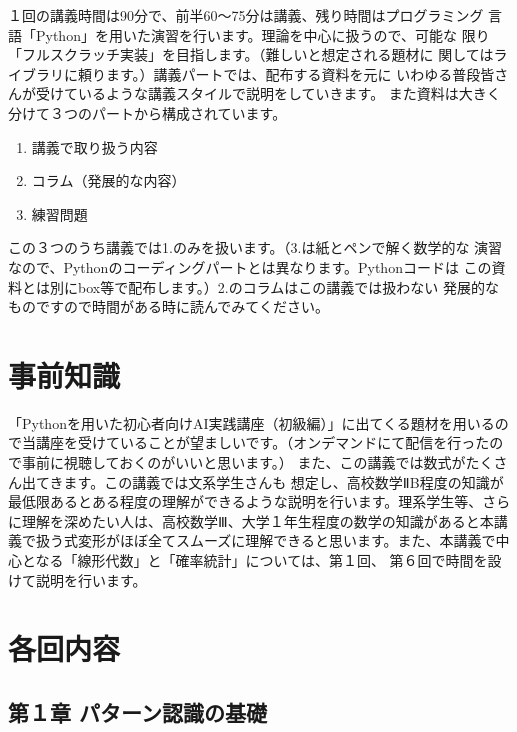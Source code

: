 \documentclass[
]{ltjarticle}
\begin{document}
１回の講義時間は90分で、前半60〜75分は講義、残り時間はプログラミング
言語「Python」を用いた演習を行います。理論を中心に扱うので、可能な
限り「フルスクラッチ実装」を目指します。（難しいと想定される題材に
関してはライブラリに頼ります。）講義パートでは、配布する資料を元に
いわゆる普段皆さんが受けているような講義スタイルで説明をしていきます。
また資料は大きく分けて３つのパートから構成されています。

\begin{enumerate}
\def\labelenumi{\arabic{enumi}.}
\item
  講義で取り扱う内容
\item
  コラム（発展的な内容）
\item
  練習問題
\end{enumerate}

この３つのうち講義では1.のみを扱います。（3.は紙とペンで解く数学的な
演習なので、Pythonのコーディングパートとは異なります。Pythonコードは
この資料とは別にbox等で配布します。）2.のコラムはこの講義では扱わない
発展的なものですので時間がある時に読んでみてください。

\hypertarget{ux4e8bux524dux77e5ux8b58}{%
\section{事前知識}\label{ux4e8bux524dux77e5ux8b58}}

「Pythonを用いた初心者向けAI実践講座（初級編）」に出てくる題材を用いるので当講座を受けていることが望ましいです。（オンデマンドにて配信を行ったので事前に視聴しておくのがいいと思います。）
また、この講義では数式がたくさん出てきます。この講義では文系学生さんも
想定し、高校数学ⅡB程度の知識が最低限あるとある程度の理解ができるような説明を行います。理系学生等、さらに理解を深めたい人は、高校数学Ⅲ、大学１年生程度の数学の知識があると本講義で扱う式変形がほぼ全てスムーズに理解できると思います。また、本講義で中心となる「線形代数」と「確率統計」については、第１回、
第６回で時間を設けて説明を行います。

\hypertarget{ux5404ux56deux5185ux5bb9}{%
\section{各回内容}\label{ux5404ux56deux5185ux5bb9}}

\hypertarget{ux7b2cuxff11ux7ae0-ux30d1ux30bfux30fcux30f3ux8a8dux8b58ux306eux57faux790e}{%
\subsection{第１章
パターン認識の基礎}\label{ux7b2cuxff11ux7ae0-ux30d1ux30bfux30fcux30f3ux8a8dux8b58ux306eux57faux790e}}
\end{document}
